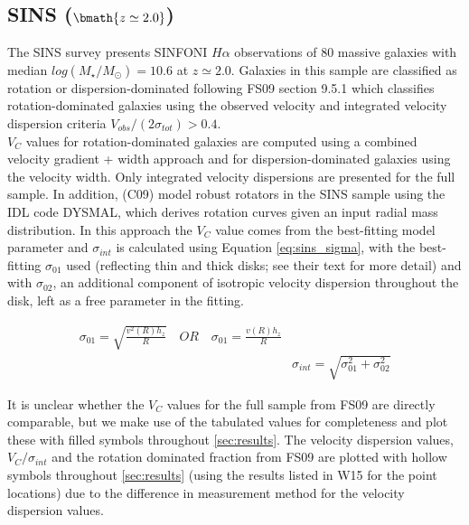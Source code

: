 \documentclass[fleqn,usenatbib]{mnras}
\begin{document}
\subsection{SINS ($\bmath{z\simeq2.0}$)}\label{subsec:SINS}
The SINS survey \citep[FS09]{ForsterSchreiber2009} presents SINFONI $H\alpha$ observations of 80 massive galaxies with median $log(M_{\star}/M_{\odot})=10.6$ at $z\simeq2.0$.
Galaxies in this sample are classified as rotation or dispersion-dominated following FS09 section 9.5.1 which classifies rotation-dominated galaxies using the observed velocity and integrated velocity dispersion criteria $V_{obs}/(2\sigma_{tot}) > 0.4$. \\

$V_{C}$ values for rotation-dominated galaxies are computed using a combined velocity gradient + width approach \citep{ForsterSchreiber2006} and for dispersion-dominated galaxies using the velocity width.
Only integrated velocity dispersions are presented for the full sample.
In addition, \cite{Cresci2009} (C09) model robust rotators in the SINS sample using the IDL code DYSMAL, which derives rotation curves given an input radial mass distribution.
In this approach the $V_{C}$ value comes from the best-fitting model parameter and $\sigma_{int}$ is calculated using Equation \ref{eq:sins_sigma}, with the best-fitting $\sigma_{01}$ used (reflecting thin and thick disks; see their text for more detail) and with $\sigma_{02}$, an additional component of isotropic velocity dispersion throughout the disk, left as a free parameter in the fitting.

\begin{equation}\label{eq:sins_sigma}
\begin{split}
\sigma_{01} = \sqrt{\frac{v^{2}(R)h_{z}}{R}} \quad OR \quad \sigma_{01} = \frac{v(R)h_{z}}{R} \\
& \sigma_{int} = \sqrt{\sigma_{01}^{2} + \sigma_{02}^{2}}
\end{split}
\end{equation}

It is unclear whether the $V_{C}$ values for the full sample from FS09 are directly comparable, but we make use of the tabulated values for completeness and plot these with filled symbols throughout \cref{sec:results}.
The velocity dispersion values, $V_{C}/\sigma_{int}$ and the rotation dominated fraction from FS09 are plotted with hollow symbols throughout \cref{sec:results} (using the results listed in W15 for the point locations) due to the difference in measurement method for the velocity dispersion values.
\end{document}
